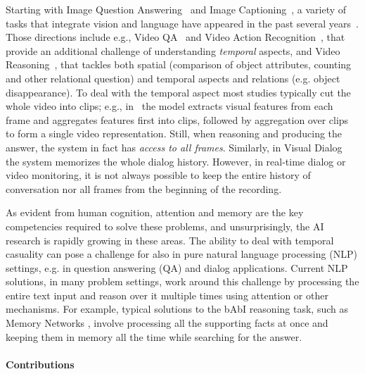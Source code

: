 Starting with Image Question Answering~\cite{malinowski2014multi,antol2015} and Image Captioning~\cite{karpathy2015deep}, a variety of tasks that integrate vision and language have appeared in the past several years~\cite{mogadala2019trends}. 
Those directions include e.g., Video QA~\cite{MovieQA} and Video Action Recognition~\cite{monfort2019moments}, that provide an additional challenge of understanding \emph{temporal} aspects, and Video Reasoning~\cite{song2018explore,yang2018dataset}, that tackles both spatial (comparison of object attributes, counting and other relational question) and temporal aspects and relations (e.g. object disappearance).
To deal with the temporal aspect most studies typically cut the whole video into clips; e.g., in~\cite{song2018explore} the model extracts visual features from each frame and aggregates features first into clips, followed by aggregation over clips to form a single video representation.
Still, when reasoning and producing the answer, the system in fact has \textit{access to all frames}. 
Similarly, in Visual Dialog~\cite{das2017visual} the system memorizes the whole dialog history.
However, in real-time dialog or video monitoring, it is not always possible to keep the entire history of conversation nor all frames from the beginning of the recording.  


As evident from human cognition, attention and memory are the key competencies required to solve these problems, and unsurprisingly, the AI research is rapidly growing in these areas.
The ability to deal with temporal casuality can pose a challenge for also in pure natural language processing (NLP) settings, e.g. in question answering (QA) and dialog applications.  
Current NLP solutions, in many problem settings, work around this challenge by processing the entire text input and reason over it multiple times using attention \cite{vaswani2017attention} or other mechanisms.
For example, typical solutions to the bAbI reasoning task, such as Memory Networks \cite{weston2014memory}, involve processing all the supporting facts at once and keeping them in memory all the time while searching for the answer.


\paragraph{Contributions}
